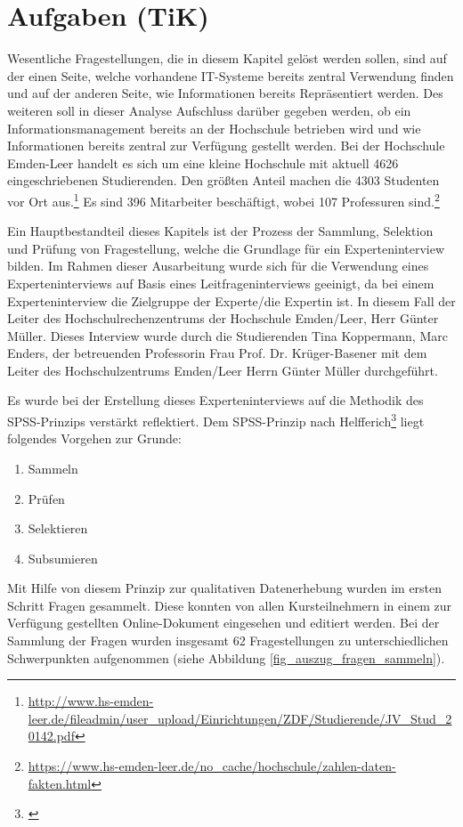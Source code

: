 \section{Aufgaben (TiK)}
Wesentliche Fragestellungen, die in diesem Kapitel gelöst werden sollen, sind auf der einen Seite, welche vorhandene IT-Systeme bereits zentral Verwendung finden und auf der anderen Seite, wie Informationen bereits Repräsentiert werden. Des weiteren soll in dieser Analyse Aufschluss darüber gegeben werden, ob ein Informationsmanagement bereits an der Hochschule betrieben wird und wie Informationen bereits zentral zur Verfügung gestellt werden.  
Bei der Hochschule Emden-Leer handelt es sich um eine kleine Hochschule mit aktuell 4626 eingeschriebenen Studierenden. Den größten Anteil machen die 4303 Studenten vor Ort aus.\footnote{\url{http://www.hs-emden-leer.de/fileadmin/user_upload/Einrichtungen/ZDF/Studierende/JV_Stud_20142.pdf}} Es sind 396 Mitarbeiter beschäftigt, wobei 107 Professuren sind.\footnote{\url{https://www.hs-emden-leer.de/no_cache/hochschule/zahlen-daten-fakten.html}}

Ein Hauptbestandteil dieses Kapitels ist der Prozess der Sammlung, Selektion und Prüfung von Fragestellung, welche die Grundlage für ein Experteninterview bilden. Im Rahmen dieser Ausarbeitung wurde sich für die Verwendung eines Experteninterviews auf Basis eines Leitfrageninterviews geeinigt, da bei einem Experteninterview die Zielgruppe der Experte/die Expertin ist. In diesem Fall der Leiter des Hochschulrechenzentrums der Hochschule Emden/Leer, Herr Günter Müller. Dieses Interview wurde durch die Studierenden Tina Koppermann, Marc Enders, der betreuenden Professorin Frau Prof. Dr. Krüger-Basener mit dem Leiter des Hochschulzentrums Emden/Leer Herrn Günter Müller durchgeführt. 

Es wurde bei der Erstellung dieses Experteninterviews auf die Methodik des SPSS-Prinzips verstärkt reflektiert. Dem SPSS-Prinzip nach Helfferich\footnote{\cite{helfferich_2009}} liegt folgendes Vorgehen zur Grunde:
\begin{enumerate}
	\item Sammeln
	\item Prüfen
	\item Selektieren
	\item Subsumieren		
\end{enumerate}
Mit Hilfe von diesem Prinzip zur qualitativen Datenerhebung wurden im ersten Schritt Fragen gesammelt. Diese konnten von allen Kursteilnehmern in einem zur Verfügung gestellten Online-Dokument eingesehen und editiert werden. Bei der Sammlung der Fragen wurden insgesamt 62 Fragestellungen zu unterschiedlichen Schwerpunkten aufgenommen (siehe Abbildung \ref{fig_auszug_fragen_sammeln}).

